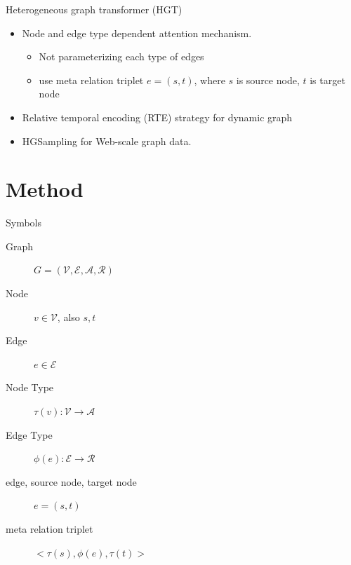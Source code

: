 \documentclass[aspectratio=1610,hyperref={colorlinks,unicode,linkcolor=blue,anchorcolor=blue,citecolor=blue,filecolor=black,urlcolor=blue}]{beamer}
\begin{document}
\begin{frame}[label={sec:org4f4ef37}]{Heterogeneous graph transformer (HGT)}
\begin{itemize}
\item Node and edge type dependent attention mechanism.
\begin{itemize}
\item Not parameterizing each type of edges
\item use meta relation triplet \(e = (s, t)\), where \(s\) is source
node, \(t\) is target node
\end{itemize}
\item Relative temporal encoding (RTE) strategy for dynamic graph
\item HGSampling for Web-scale graph data.
\end{itemize}
\end{frame}

\section{Method}
\label{sec:orgb3ff278}

\begin{frame}[label={sec:org6006c9d}]{Symbols}
\begin{description}
\item[{Graph}] \(G = (\mathcal{V}, \mathcal{E}, \mathcal{A},
  \mathcal{R})\)
\item[{Node}] \(v \in \mathcal{V}\), also \(s,t\)
\item[{Edge}] \(e \in \mathcal{E}\)
\item[{Node Type}] \(\tau(v): \mathcal{V} \rightarrow
  \mathcal{A}\)
\item[{Edge Type}] \(\phi(e): \mathcal{E} \rightarrow
  \mathcal{R}\)
\item[{edge, source node, target node}] \(e = (s, t)\)
\item[{meta relation triplet}] \(<\tau(s),\phi(e),\tau(t)>\)
\end{description}
\end{frame}
\end{document}
